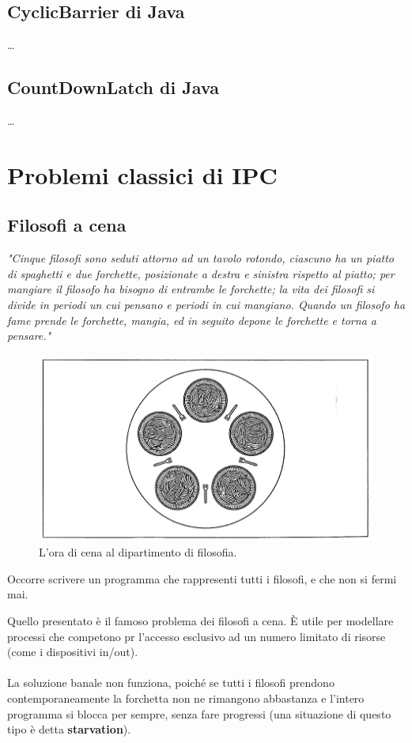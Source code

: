 \subsection{CyclicBarrier di Java}
\dots


\subsection{CountDownLatch di Java}
\dots








\newpage
\section{Problemi classici di IPC}

\subsection{Filosofi a cena}
\textit{"Cinque filosofi sono seduti attorno ad un tavolo rotondo, ciascuno ha un piatto  di spaghetti e due forchette, posizionate a destra e sinistra rispetto al piatto; per mangiare il filosofo ha bisogno di entrambe le forchette; la vita dei filosofi si divide in periodi un cui pensano e periodi in cui mangiano. Quando un filosofo ha fame prende le forchette, mangia, ed in seguito depone le forchette e torna a pensare."}

\begin{figure}[H]
    \centering
    \includegraphics[width=0.5\linewidth]{assets/tavolofilosofi6.png}
    \caption{L'ora di cena al dipartimento di filosofia.}
\end{figure}

Occorre scrivere un programma che rappresenti tutti i filosofi, e che non si fermi mai.

Quello presentato è il famoso problema dei filosofi a cena. È utile per modellare processi che competono pr l'accesso esclusivo ad un numero limitato di risorse (come i dispositivi in/out).

\paragraph*{}
La soluzione banale non funziona, poiché se tutti i filosofi prendono contemporaneamente la forchetta non ne rimangono abbastanza e l'intero programma si blocca per sempre, senza fare progressi (una situazione di questo tipo è detta \textbf{starvation}). 

